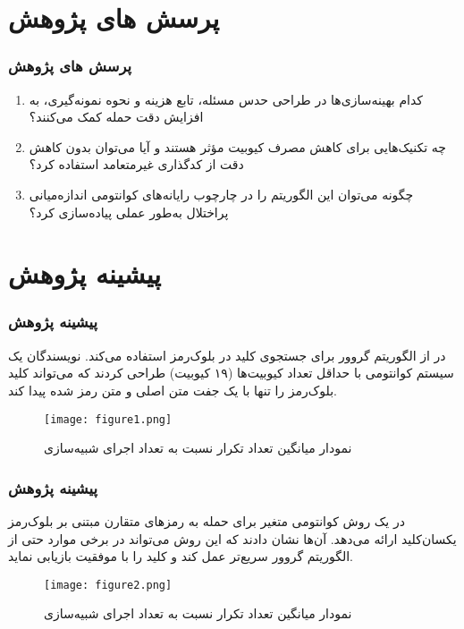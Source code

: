 \documentclass[xcolor=dvipsnames, professionalfonts, aspectratio=169, 11pt]{beamer}
\begin{document}
\section{پرسش های پژوهش}
\begin{frame}
    \frametitle{پرسش های پژوهش}
    \begin{enumerate}
        \item کدام بهینه‌سازی‌ها در طراحی حدس مسئله، تابع هزینه و نحوه نمونه‌گیری، به افزایش دقت حمله کمک می‌کنند؟
        \item چه تکنیک‌هایی برای کاهش مصرف کیوبیت مؤثر هستند و آیا می‌توان بدون کاهش دقت از کدگذاری غیرمتعامد استفاده کرد؟
        \item چگونه می‌توان این الگوریتم را در چارچوب رایانه‌های کوانتومی اندازه‌میانی پراختلال به‌طور عملی پیاده‌سازی کرد؟
    \end{enumerate}
\end{frame}

\section{پیشینه پژوهش}
\begin{frame}
    \frametitle{پیشینه پژوهش}
    \begin{moredi}
        \item در \cite{denisenko2019application} از الگوریتم گروور برای جستجوی کلید در بلوک‌رمز استفاده می‌کند. نویسندگان یک سیستم کوانتومی با حداقل تعداد کیوبیت‌ها (۱۹ کیوبیت) طراحی کردند که می‌تواند کلید بلوک‌رمز را تنها با یک جفت متن اصلی و متن رمز شده پیدا کند.
        \begin{figure}
            \vspace{0.4cm}
            \texttt{[image: figure1.png]}
            \caption{نمودار میانگین تعداد تکرار نسبت به تعداد اجرای شبیه‌سازی}
        \end{figure}
    \end{moredi}
\end{frame}

\begin{frame}
    \frametitle{پیشینه پژوهش}
    \begin{moredi}
        \item در \cite{zhang2022variational} یک روش کوانتومی متغیر برای حمله به رمزهای متقارن مبتنی بر بلوک‌رمز یکسان‌کلید ارائه می‌دهد. آن‌ها نشان دادند که این روش می‌تواند در برخی موارد حتی از الگوریتم گروور سریع‌تر عمل کند و کلید را با موفقیت بازیابی نماید. 
        \begin{figure}            
            \vspace{0.2cm}
            \texttt{[image: figure2.png]}
            \caption{نمودار میانگین تعداد تکرار نسبت به تعداد اجرای شبیه‌سازی}
        \end{figure}
    \end{moredi}
\end{frame}
\end{document}
